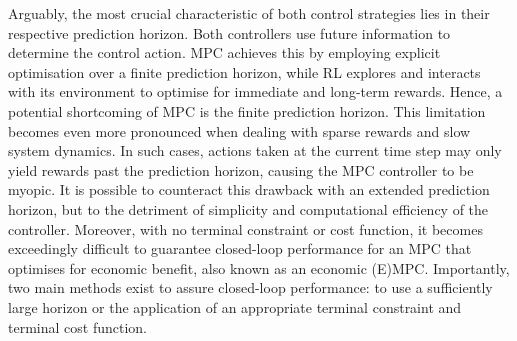 Arguably, the most crucial characteristic of both control strategies lies in their respective prediction horizon. Both controllers use future information to determine the control action. MPC achieves this by employing explicit optimisation over a finite prediction horizon, while RL explores and interacts with its environment to optimise for immediate and long-term rewards. Hence, a potential shortcoming of MPC is the finite prediction horizon. This limitation becomes even more pronounced when dealing with sparse rewards and slow system dynamics. In such cases, actions taken at the current time step may only yield rewards past the prediction horizon, causing the MPC controller to be myopic. It is possible to counteract this drawback with an extended prediction horizon, but to the detriment of simplicity and computational efficiency of the controller. Moreover, with no terminal constraint or cost function, it becomes exceedingly difficult to guarantee closed-loop performance for an MPC that optimises for economic benefit, also known as an economic (E)MPC. Importantly, two main methods exist to assure closed-loop performance: to use a sufficiently large horizon or the application of an appropriate terminal constraint and terminal cost function.

